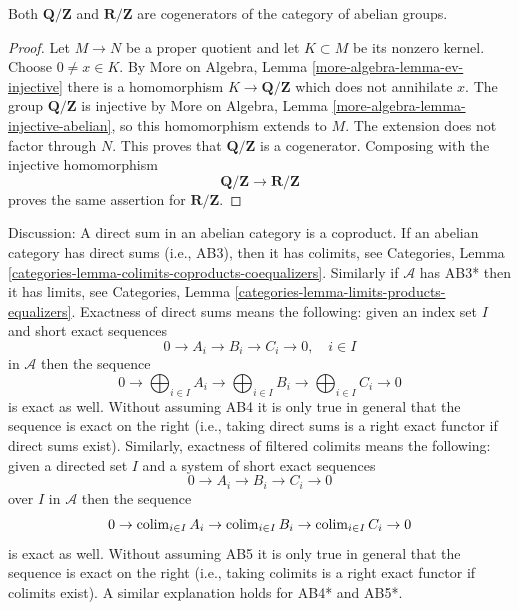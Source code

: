 \begin{lemma}
\label{lemma-cogenerators-abelian-groups}
\begin{reference}
\cite[Chapter I, \S 1.9, p. 135]{Tohoku}
\end{reference}
Both $\mathbf{Q}/\mathbf{Z}$ and $\mathbf{R}/\mathbf{Z}$ are
cogenerators of the category of abelian groups.
\end{lemma}

\begin{proof}
Let $M \to N$ be a proper quotient and let $K \subset M$ be its
nonzero kernel. Choose $0 \neq x \in K$. By
More on Algebra, Lemma \ref{more-algebra-lemma-ev-injective}
there is a homomorphism $K \to \mathbf{Q}/\mathbf{Z}$ which does not
annihilate $x$. The group $\mathbf{Q}/\mathbf{Z}$ is injective by
More on Algebra, Lemma \ref{more-algebra-lemma-injective-abelian},
so this homomorphism extends to $M$. The extension does not factor
through $N$. This proves that $\mathbf{Q}/\mathbf{Z}$ is a
cogenerator. Composing with the injective homomorphism
$$
\mathbf{Q}/\mathbf{Z} \longrightarrow \mathbf{R}/\mathbf{Z}
$$
proves the same assertion for $\mathbf{R}/\mathbf{Z}$.
\end{proof}

\noindent
Discussion: A direct sum in an abelian category is a coproduct.
If an abelian category has direct sums (i.e., AB3), then it has colimits, see
Categories, Lemma \ref{categories-lemma-colimits-coproducts-coequalizers}. 
Similarly if $\mathcal{A}$ has AB3* then it has limits, see
Categories, Lemma \ref{categories-lemma-limits-products-equalizers}. 
Exactness of direct sums means the following: given an index set $I$
and short exact sequences
$$
0 \to A_i \to B_i \to C_i \to 0,\quad i \in I
$$
in $\mathcal{A}$ then the sequence
$$
0 \to
\bigoplus\nolimits_{i \in I} A_i \to
\bigoplus\nolimits_{i \in I} B_i \to
\bigoplus\nolimits_{i \in I} C_i \to 0
$$
is exact as well. Without assuming AB4 it is only true in general that
the sequence is exact on the right (i.e., taking direct sums is a right
exact functor if direct sums exist). Similarly, exactness of filtered
colimits means the following: given a directed set $I$
and a system of short exact sequences
$$
0 \to A_i \to B_i \to C_i \to 0
$$
over $I$ in $\mathcal{A}$ then the sequence
$$
0 \to
\mathop{\mathrm{colim}}\nolimits_{i \in I} A_i \to
\mathop{\mathrm{colim}}\nolimits_{i \in I} B_i \to
\mathop{\mathrm{colim}}\nolimits_{i \in I} C_i \to 0
$$
is exact as well. Without assuming AB5 it is only true in general that
the sequence is exact on the right (i.e., taking colimits is a right
exact functor if colimits exist). A similar explanation holds for
AB4* and AB5*.


